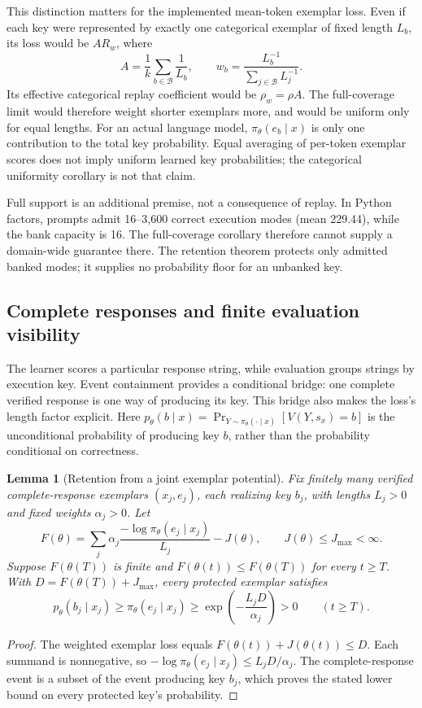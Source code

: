\documentclass{article}
\newcommand{\1}{\mathbf 1}
\newtheorem{lemma}{Lemma}[section]
\theoremstyle{remark}
\theoremstyle{definition}
\theoremstyle{plain}
\begin{document}
This distinction matters for the implemented mean-token exemplar loss.
Even if each key were represented by exactly one categorical exemplar of
fixed length $L_b$, its loss would be $A R_w$, where
\[
 A=\frac1k\sum_{b\in\mathcal B}\frac1{L_b},\qquad
 w_b=\frac{L_b^{-1}}{\sum_{j\in\mathcal B}L_j^{-1}}.
\]
Its effective categorical replay coefficient would be $\rho_w=\rho A$.
The full-coverage limit would therefore weight shorter exemplars more, and
would be uniform only for equal lengths. For an actual language model,
$\pi_\theta(e_b\mid x)$ is only one contribution to the total key probability.
Equal averaging of per-token exemplar scores does not imply uniform learned
key probabilities; the categorical uniformity corollary is not that claim.

Full support is an additional premise, not a consequence of replay. In
Python factors, prompts admit 16--3,600 correct execution modes (mean 229.44),
while the bank capacity is 16. The full-coverage corollary therefore cannot
supply a domain-wide guarantee there. The retention theorem protects only
admitted banked modes; it supplies no probability floor for an unbanked key.

\subsection{Complete responses and finite evaluation visibility}
\label{app:theory-exemplar-bridge}

The learner scores a particular response string, while evaluation groups
strings by execution key. Event containment provides a conditional bridge:
one complete verified response is one way of producing its key. This bridge
also makes the loss's length factor explicit. Here
$p_\theta(b\mid x)=\Pr_{Y\sim\pi_\theta(\cdot\mid x)}[V(Y,s_x)=b]$
is the unconditional probability of producing key $b$, rather than the
probability conditional on correctness.

\begin{lemma}[Retention from a joint exemplar potential]
\label{lem:shared-exemplar-retention}
Fix finitely many verified complete-response exemplars $(x_j,e_j)$, each
realizing key $b_j$, with lengths $L_j>0$ and fixed weights $\alpha_j>0$.
Let
\[
 F(\theta)=\sum_j\alpha_j
 \frac{-\log\pi_\theta(e_j\mid x_j)}{L_j}-J(\theta),
 \qquad J(\theta)\le J_{\max}<\infty.
\]
Suppose $F(\theta(T))$ is finite and
$F(\theta(t))\le F(\theta(T))$ for every $t\ge T$. With
$D=F(\theta(T))+J_{\max}$, every protected exemplar satisfies
\[
 p_\theta(b_j\mid x_j)\ge\pi_\theta(e_j\mid x_j)
 \ge\exp\!\left(-\frac{L_jD}{\alpha_j}\right)>0
 \qquad(t\ge T).
\]
\end{lemma}
\begin{proof}
The weighted exemplar loss equals $F(\theta(t))+J(\theta(t))\le D$.
Each summand is nonnegative, so
$-\log\pi_\theta(e_j\mid x_j)\le L_jD/\alpha_j$.
The complete-response event is a subset of the event producing key $b_j$,
which proves the stated lower bound on every protected key's probability.
\end{proof}
\end{document}

